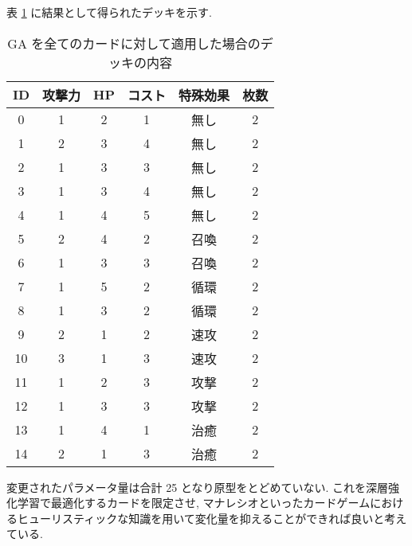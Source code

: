 \documentclass{jarticle}     %
\begin{document}
表 \ref{table:resultdeck} に結果として得られたデッキを示す.
\begin{table}[t]
  \centering
  \caption{GA を全てのカードに対して適用した場合のデッキの内容}
  \label{table:resultdeck}
  \begin{tabular}{|c|c|c|c|c|c|}
  \hline
  ID & 攻撃力 & HP & コスト & 特殊効果 & 枚数 \\ \hline
  0 & 1 & 2 & 1 & 無し & 2 \\ \hline
  1 & 2 & 3 & 4 & 無し & 2 \\ \hline
  2 & 1 & 3 & 3 & 無し & 2 \\ \hline
  3 & 1 & 3 & 4 & 無し & 2 \\ \hline
  4 & 1 & 4 & 5 & 無し & 2 \\ \hline
  5 & 2 & 4 & 2 & 召喚 & 2 \\ \hline
  6 & 1 & 3 & 3 & 召喚 & 2 \\ \hline
  7 & 1 & 5 & 2 & 循環 & 2 \\ \hline
  8 & 1 & 3 & 2 & 循環 & 2 \\ \hline
  9 & 2 & 1 & 2 & 速攻 & 2 \\ \hline
  10 & 3 & 1 & 3 & 速攻 & 2 \\ \hline
  11 & 1 & 2 & 3 & 攻撃 & 2 \\ \hline
  12 & 1 & 3 & 3 & 攻撃 & 2 \\ \hline
  13 & 1 & 4 & 1 & 治癒 & 2 \\ \hline
  14 & 2 & 1 & 3 & 治癒 & 2 \\ \hline
  \end{tabular}
  \end{table}
変更されたパラメータ量は合計 25 となり原型をとどめていない. 
これを深層強化学習で最適化するカードを限定させ, マナレシオといったカードゲームにおけるヒューリスティックな知識を用いて変化量を抑えることができれば良いと考えている.
\end{document}
